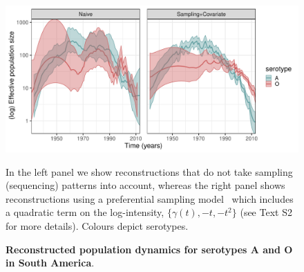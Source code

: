 \documentclass[10pt]{article}
\begin{document}
\begin{figure}[!ht]
\begin{center}
\includegraphics[scale=0.6]{FIGURES/PLOTS/population_size_reconstructions_full.pdf}
\end{center}
\caption{\textbf{Reconstructed population dynamics for serotypes A and O in South America}.
}
In the left panel we show reconstructions that do not take sampling (sequencing) patterns into account, whereas the right panel shows reconstructions using a preferential sampling model~\citep{Karcher2019} which includes a quadratic term on the log-intensity, $\{\gamma(t), -t, -t^2\}$ (see Text S2 for more details).
Colours depict serotypes.

\label{fig:popdyn}
\end{figure}
\end{document}
